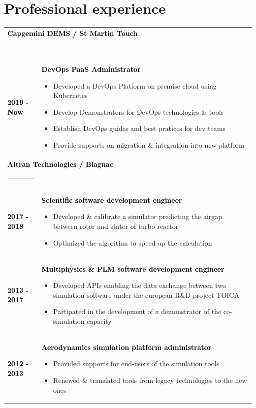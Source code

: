 \documentclass[10pt,A4]{article}
\begin{document}
\begin{minipage}[c]{0.7\textwidth}
\section*{\hspace{0.5cm}Professional experience}
%
\begin{tabular}{p{2cm}p{11cm}}
\multicolumn{2}{l}{\textcolor{black}{\bf Capgemini DEMS / St Martin Touch}}\\
\noindent\textcolor{blue}{\rule{\textwidth}{.8mm}}\\
%
\textcolor{black}{\bf 2019 - Now} & \textcolor{black}{\bf DevOps PaaS Administrator}
\begin{itemize}
  \item \small Developed a DevOps Platform on premise cloud using Kubernetes
  \item \small Develop Demonstrators for DevOps technologies \& tools   
  \item \small Establish DevOps guides and best pratices for dev teams
  \item \small Provide supports on migration \& integration into new platform
\end{itemize}\\
%
\multicolumn{2}{l}{\textcolor{black}{\bf Altran Technologies / Blagnac}}\\
\noindent\textcolor{blue}{\rule{\textwidth}{.8mm}}\\
%
\textcolor{black}{\bf 2017 - 2018} & \textcolor{black}{\bf Scientific software development engineer}
\begin{itemize}
  \item \small Developed \& calibrate a simulator predicting the airgap between rotor and stator of turbo reactor
  \item \small Optimized the algorithm to speed up the calculation
\end{itemize}\\
%
\textcolor{black}{\bf 2013 - 2017} & \textcolor{black}{\bf Multiphysics \& PLM software development engineer}
\begin{itemize}
  \item \small Developed APIs enabling the data exchange between two simulation software under the european R\&D project TOICA
  \item \small Partipated in the development of a demonstrator of the co-simulation capacity
\end{itemize}\\
%
\textcolor{black}{\bf 2012 - 2013} & \textcolor{black}{\bf Aerodynamics simulation platform administrator}
\begin{itemize}
  \item \small Provided supports for end-users of the simulation tools
  \item \small Renewed \& translated tools from legacy technologies to the new ones
\end{itemize}
%
\end{tabular}
%
\vspace*{-8mm}

\end{minipage}
\end{document}
